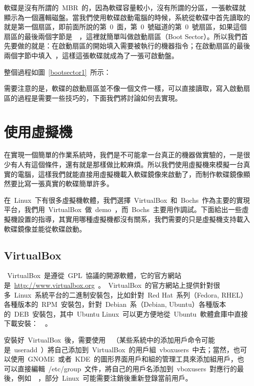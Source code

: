 軟碟是沒有所謂的~MBR~的，因為軟碟容量較小，沒有所謂的分區，一張軟碟就顯示為一個邏輯磁盤。當我們使用軟碟啟動電腦的時候，系統從軟碟中首先讀取的就是第一個扇區，即前面所說的第~0~面，第~0~號磁道的第~0~號扇區，如果這個扇區的最後兩個字節是~~，這裡就簡單叫做啟動扇區（Boot Sector）。所以我們首先要做的就是：在啟動扇區的開始填入需要被執行的機器指令；在啟動扇區的最後兩個字節中填入~，這樣這張軟碟就成為了一張可啟動盤。


整個過程如圖~\ref{bootsector1}~所示：


需要注意的是，軟碟的啟動扇區並不像一個文件一樣，可以直接讀取，寫入啟動扇區的過程是需要一些技巧的，下面我們將討論如何去實現。

\section{使用虛擬機}

在實現一個簡單的作業系統時，我們是不可能拿一台真正的機器做實驗的，一是很少有人有這個條件，還有就是那樣做比較麻煩。所以我們使用虛擬機來模擬一台真實的電腦，這樣我們就能直接用虛擬機載入軟碟鏡像來啟動了，而制作軟碟鏡像顯然要比寫一張真實的軟碟簡單許多。

在~Linux~下有很多虛擬機軟體，我們選擇~VirtualBox~和~Bochs~作為主要的實現平台，我們用~VirtualBox~做~demo~，而~Bochs~主要用作調試。下面給出一些虛擬機設置的指導，其實用哪種虛擬機都沒有關系，我們需要的只是虛擬機支持載入軟碟鏡像並能從軟碟啟動。

\subsection{VirtualBox}

~VirtualBox~是遵從~GPL~協議的開源軟體，它的官方網站是~\url{http://www.virtualbox.org}~。~VirtualBox~的官方網站上提供針對很多~Linux~系統平台的二進制安裝包，比如針對~Red Hat~系列（Fedora, RHEL）各種版本的~RPM~安裝包，針對~Debian~系（Debian, Ubuntu）各種版本的~DEB~安裝包，其中~Ubuntu
Linux~可以更方便地從~Ubuntu~軟體倉庫中直接下載安裝：~~。

安裝好~VirtualBox~後，需要使用~~（某些系統中的添加用戶命令可能是~useradd~）將自己添加到~VirtualBox~的用戶組~vboxusers~中去；當然，也可以使用~GNOME~或者~KDE~的圖形界面用戶和組的管理工具來添加組用戶，也可以直接編輯~/etc/group~文件，將自己的用戶名添加到~vboxusers~對應行的最後，例如~~，部分~Linux~可能需要注銷後重新登錄當前用戶。

